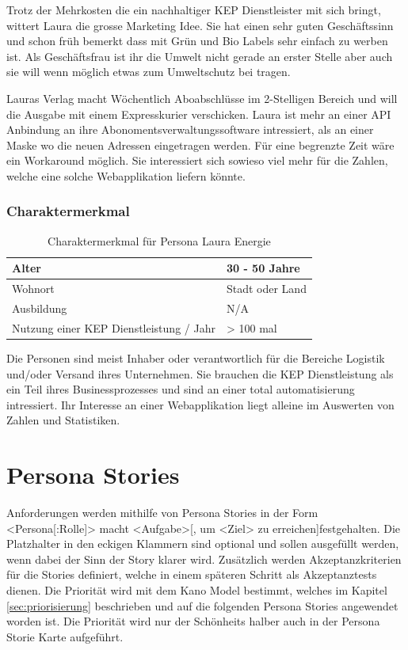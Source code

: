 \begin{description}
Trotz der Mehrkosten die ein nachhaltiger KEP Dienstleister mit sich bringt, wittert Laura die grosse Marketing Idee. Sie hat einen sehr guten Geschäftssinn und schon früh bemerkt dass mit Grün und Bio Labels sehr einfach zu werben ist. Als Geschäftsfrau ist ihr die Umwelt nicht gerade an erster Stelle aber auch sie will wenn möglich etwas zum Umweltschutz bei tragen.


Lauras Verlag macht Wöchentlich Aboabschlüsse im 2-Stelligen Bereich und will die Ausgabe mit einem Expresskurier verschicken. Laura ist mehr an einer API Anbindung an ihre Abonomentsverwaltungssoftware intressiert, als an einer Maske wo die neuen Adressen eingetragen werden. Für eine begrenzte Zeit wäre ein Workaround möglich. Sie interessiert sich sowieso viel mehr für die Zahlen, welche eine solche Webapplikation liefern könnte.

\subsubsection{Charaktermerkmal}
\begin{table}[]
\centering

\label{my-label}
\begin{tabular}{|l|l|}
\hline
Alter                                   & 30 - 50 Jahre        \\ \hline
Wohnort                                 & Stadt oder Land         \\ \hline
Ausbildung                              & N/A  \\ \hline
Nutzung einer KEP Dienstleistung / Jahr & > 100 mal            \\ \hline
\end{tabular}
\caption{Charaktermerkmal für Persona Laura Energie}
\end{table}

Die Personen sind meist Inhaber oder verantwortlich für die Bereiche Logistik und/oder Versand ihres Unternehmen. Sie brauchen die KEP Dienstleistung als ein Teil ihres Businessprozesses und sind an einer total automatisierung intressiert. Ihr Interesse an einer Webapplikation liegt alleine im Auswerten von Zahlen und Statistiken.



\section{Persona Stories}
\label{sec:personastories}

 Anforderungen werden mithilfe von Persona Stories in der Form \glqq <Persona[:Rolle]> macht <Aufgabe>[, um <Ziel> zu erreichen]\grqq festgehalten. Die Platzhalter in den eckigen Klammern sind optional und sollen ausgefüllt werden, wenn dabei der Sinn der Story klarer wird. Zusätzlich werden Akzeptanzkriterien für die Stories definiert, welche in einem späteren Schritt als Akzeptanztests dienen. Die Priorität wird mit dem Kano Model bestimmt, welches im Kapitel \ref{sec:priorisierung} beschrieben und auf die folgenden Persona Stories angewendet worden ist. Die Priorität wird nur der Schönheits halber auch in der Persona Storie Karte aufgeführt.



\end{description}

